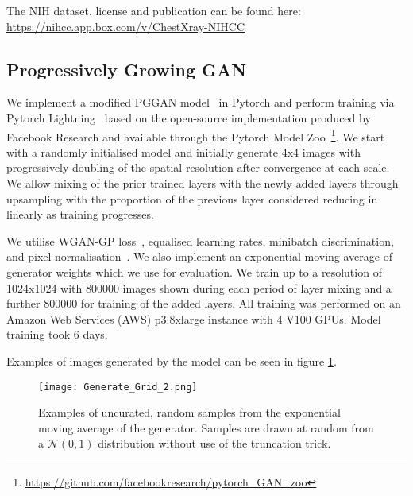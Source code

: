 \documentclass{article}
\begin{document}
The NIH dataset, license and publication can be found here: \url{https://nihcc.app.box.com/v/ChestXray-NIHCC}

\subsection{Progressively Growing GAN}
\label{sec:gan-train}
We implement a modified PGGAN model~\cite{karrasProgressiveGrowingGANs2018} in Pytorch and perform training via Pytorch Lightning~\cite{falconPyTorchLightning2019} based on the open-source implementation produced by Facebook Research and available through the Pytorch Model Zoo~\footnote{\url{https://github.com/facebookresearch/pytorch_GAN_zoo}}. We start with a randomly initialised model and initially generate 4x4 images with progressively doubling of the spatial resolution after convergence at each scale. We allow mixing of the prior trained layers with the newly added layers through upsampling with the proportion of the previous layer considered reducing in linearly as training progresses.

We utilise WGAN-GP loss~\cite{gulrajaniImprovedTrainingWasserstein2017}, equalised learning rates, minibatch discrimination, and pixel normalisation~\cite{karrasProgressiveGrowingGANs2018}. We also implement an exponential moving average of generator weights which we use for evaluation. We train up to a resolution of 1024x1024 with \num{800000} images shown during each period of layer mixing and a further \num{800000} for training of the added layers. All training was performed on an Amazon Web Services (AWS) p3.8xlarge instance with 4 V100 GPUs. Model training took 6 days.

Examples of images generated by the model can be seen in figure \ref{fig:collage}.

\begin{figure}
    \centering
    \texttt{[image: Generate\_Grid\_2.png]}
    \caption{Examples of uncurated, random samples from the exponential moving average of the generator. Samples are drawn at random from a $\mathcal{N}(0, 1)$ distribution without use of the truncation trick.}
    \label{fig:collage}
\end{figure}
\end{document}
